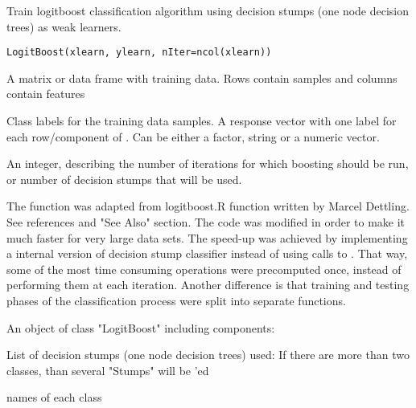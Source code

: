 \begin{Description}\relax
Train logitboost classification algorithm using decision 
stumps (one node decision trees) as weak learners.
\end{Description}
\begin{Usage}
\begin{verbatim}LogitBoost(xlearn, ylearn, nIter=ncol(xlearn))\end{verbatim}
\end{Usage}
\begin{Arguments}
\begin{ldescription}
\item[\code{xlearn}] A matrix or data frame with training data. Rows contain samples 
and columns contain features
\item[\code{ylearn}] Class labels for the training data samples. 
A response vector with one label for each row/component of .
Can be either a factor, string or a numeric vector.
\item[\code{nIter}] An integer, describing the number of iterations for
which boosting should be run, or number of decision stumps that will be 
used.
\end{ldescription}
\end{Arguments}
\begin{Details}\relax
The function was adapted from logitboost.R function written by Marcel 
Dettling. See references and "See Also" section. The code was modified in 
order to make it much faster for very large data sets. The speed-up was 
achieved by implementing a internal version of decision stump classifier 
instead of using calls to . That way, some of the most time 
consuming operations were precomputed once, instead of performing them at 
each iteration. Another difference is that training and testing phases of the 
classification process were split into separate functions.
\end{Details}
\begin{Value}
An object of class "LogitBoost" including components: 
\begin{ldescription}
\item[\code{Stump}] List of decision stumps (one node decision trees) used:
If there are more than two classes, than several "Stumps" will be
'ed

\item[\code{lablist}] names of each class
\end{ldescription}
\end{Value}
